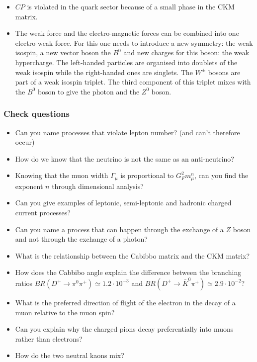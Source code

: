 \documentclass[12pt]{article}
\begin{document}
\begin{itemize}
\item $CP$ is violated in the quark sector because of a small phase in the CKM matrix.
  \item The weak force and the electro-magnetic forces can be combined into one electro-weak force. For this one needs to introduce a new symmetry: the weak isospin, a new vector boson the $B^0$ and new charges for this boson: the weak hypercharge. The left-handed particles are organised into doublets of the weak isospin while the right-handed ones are singlets. The $W^\pm$ bosons are part of a weak isospin triplet. The third component of this triplet mixes with the $B^0$ boson to give the photon and the $Z^0$ boson. 
\end{itemize}
\subsubsection{Check questions}
\begin{itemize}
\item Can you name processes that violate lepton number? (and can't therefore occur)
\item How do we know that the neutrino is not the same as an anti-neutrino?
\item Knowing that the muon width $\Gamma_\mu$ is proportional to $G_F^2m_\mu^n$, can you find the exponent $n$ through dimensional analysis?
  \item Can you give examples of leptonic, semi-leptonic and hadronic charged current processes?
  \item Can you name a process that can happen through the exchange of a $Z$ boson and not through the exchange of a photon?
  \item What is the relationship between the Cabibbo matrix and the CKM matrix?
  \item How does the Cabbibo angle explain the difference between the branching ratios $BR(D^+\rightarrow \pi^0\pi^+)\simeq 1.2\cdot 10^{-3}$ and   $BR(D^+\rightarrow \bar{K}^0\pi^+)\simeq 2.9\cdot 10^{-2}$?
  \item What is the preferred direction of flight of the electron in the decay of a muon relative to the muon spin?
  \item Can you explain why the charged pions decay preferentially into muons rather than electrons?
    \item How do the two neutral kaons mix?
\end{itemize}




\end{document}
